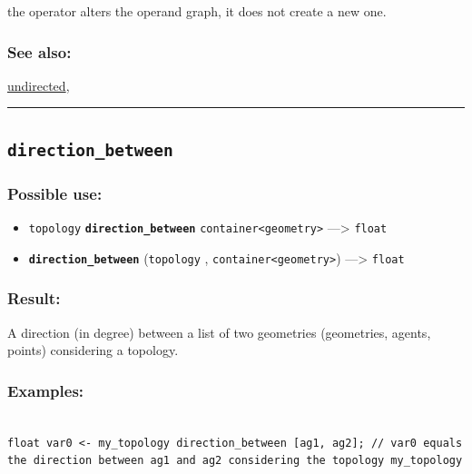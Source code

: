 \documentclass[]{book}
\providecommand{\tightlist}{%
  \setlength{\itemsep}{0pt}\setlength{\parskip}{0pt}}
\theoremstyle{definition}
\theoremstyle{definition}
\theoremstyle{definition}
\theoremstyle{remark}
\begin{document}
the operator alters the operand graph, it does not create a new one.

\subsubsection{See also:}\label{see-also-77}

\href{operators-s-to-z.html\#undirected}{undirected},

\begin{center}\rule{0.5\linewidth}{\linethickness}\end{center}

\subsection{\texorpdfstring{\texttt{direction\_between}}{direction\_between}}\label{direction_between}

\subsubsection{Possible use:}\label{possible-use-133}

\begin{itemize}
\tightlist
\item
  \texttt{topology} \textbf{\texttt{direction\_between}}
  \texttt{container\textless{}geometry\textgreater{}} ---\textgreater{}
  \texttt{float}
\item
  \textbf{\texttt{direction\_between}} (\texttt{topology} ,
  \texttt{container\textless{}geometry\textgreater{}}) ---\textgreater{}
  \texttt{float}
\end{itemize}

\subsubsection{Result:}\label{result-129}

A direction (in degree) between a list of two geometries (geometries,
agents, points) considering a topology.

\subsubsection{Examples:}\label{examples-100}

\begin{verbatim}
 
float var0 <- my_topology direction_between [ag1, ag2]; // var0 equals the direction between ag1 and ag2 considering the topology my_topology
\end{verbatim}
\end{document}
